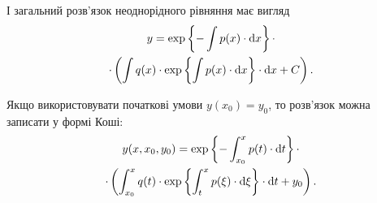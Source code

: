 І загальний розв'язок неоднорідного рівняння має вигляд
\begin{multline*} 
	y = \exp \left\{ - \int p(x) \cdot \mathop{}\!\mathrm{d} x \right\} \cdot \\
	\cdot \left( \int q(x) \cdot \exp \left\{\int p(x) \cdot \mathop{}\!\mathrm{d} x \right\} \cdot \mathop{}\!\mathrm{d} x + C\right).
\end{multline*}

Якщо використовувати початкові умови $y(x_0) = y_0$, то розв'язок можна записати у формі Коші:
\begin{multline*} 
	y(x, x_0, y_0) = \exp \left\{ - \int_{x_0}^x p(t) \cdot \mathop{}\!\mathrm{d} t \right\} \cdot \\
	\cdot \left( \int_{x_0}^x q(t) \cdot \exp \left\{\int_t^x p(\xi) \cdot \mathop{}\!\mathrm{d} \xi \right\} \cdot \mathop{}\!\mathrm{d} t + y_0\right).
\end{multline*}
